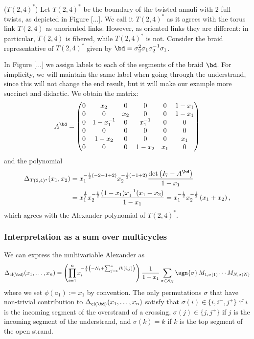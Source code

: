 \documentclass[11pt,e-only]{amsart}
\begin{document}
\begin{example} ($T(2,4)^*$) Let $T(2,4)^*$ be the boundary of the twisted annuli with 2 full twists, as depicted in Figure [...]. We call it $T(2,4)^*$ as it agrees with the torus link $T(2,4)$ as unoriented links. However, as oriented links they are different: in particular, $T(2,4)$ is fibered, while $T(2,4)^*$ is not. Consider the braid representative of $T(2,4)^*$ given by $\bd=\sigma_2^2\sigma_1\sigma_2^{-1}\sigma_1$. 

In Figure [...] we assign labels to each of the segments of the braid $\bd$. For simplicity, we will maintain the same label when going through the understrand, since this will not change the end result, but it will make our example more succinct and didactic. We obtain the matrix:
\begin{equation}\label{eq:T24*-matrix}
    A^{\bd} = \begin{pmatrix}
        0 & x_2 & 0 & 0 & 0 & 1-x_1 \\
        0 & 0 & x_2 & 0 & 0 & 1-x_1 \\
        0 & 1-x_1^{-1} & 0 & x_1^{-1} & 0 & 0 \\
        0 & 0 & 0 & 0 & 0 & 0 \\
        0 & 1-x_2 & 0 & 0 & 0 & x_1 \\
        0 & 0 & 0 & 1-x_2 & x_1 &0 \\
    \end{pmatrix}
\end{equation}
and the polynomial
\begin{equation}
\begin{split}
    \Delta_{T(2,4)^*}(x_1,x_2)&=x_1^{-\frac{1}{2}(-2-1+2)}x_2^{-\frac{1}{2}(-1+2)}\frac{\det\left(I_7-A^\bd\right)}{1-x_1} \\&= x_1^{\frac{1}{2}}x_2^{-\frac{1}{2}}\frac{(1-x_1)x_1^{-1}(x_1+x_2)}{1-x_1} = x_1^{-\frac12}x_2^{-\frac12}\left(x_1+x_2\right),      
\end{split}
\end{equation}
which agrees with the Alexander polynomial of $T(2,4)^*$.
\end{example}

\subsubsection{Interpretation as a sum over multicycles}

We can express the multivariable Alexander as
\begin{equation}
    \Delta_{\mathrm{cl}(\bd)}(x_1,\dots,x_n) = \left(\prod_{i=1}^n x_i^{-\frac{1}{2}\left(-N_i+\sum_{j=1}^n lk(i,j)\right)}\right)\frac{1}{1-x_1}\sum_{\sigma\in S_N} \sgn{\sigma} \,M_{1,\sigma(1)}\cdots M_{N,\sigma(N)}
\end{equation}
where we set $\phi(a_1):=x_1$ by convention. The only permutations $\sigma$ that have non-trivial contribution to $\Delta_{\mathrm{cl}(\bd)}(x_1,\dots,x_n)$ satisfy that $\sigma(i)\in\{i,i^+,j^+\}$ if $i$ is the incoming segment of the overstrand of a crossing, $\sigma(j)\in\{j,j^+\}$ if $j$ is the incoming segment of the understrand, and $\sigma(k)=k$ if $k$ is the top segment of the open strand.
\end{document}

